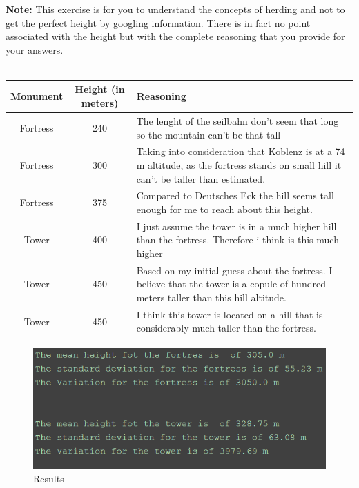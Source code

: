 \documentclass{WeSTassignment}
\begin{document}
\textbf{Note:} This exercise is for you to understand the concepts of herding and not to get the perfect height by googling information. There is in fact no point associated with the height but with the complete reasoning that you provide for your answers. \\ \\

\begin{center}
\begin{tabular}{ | c | c | p{7cm} | }
\hline
Monument & Height (in meters) & Reasoning \\
\hline
 Fortress & 240 & The lenght of the seilbahn don't seem that long so the mountain can't be that tall \\ 
 \hline
 Fortress & 300 & Taking into consideration that Koblenz is at a 74 m altitude, as the fortress stands on small hill it can't be taller than estimated. \\  
 \hline
 Fortress & 375 & Compared to Deutsches Eck the hill seems tall enough for me to reach about this height.  \\
\hline
 Tower & 400 &  I just assume the tower is in a much higher hill than the fortress. Therefore i think is this much higher  \\
 \hline
 Tower & 450 & Based on my initial guess about the fortress. I believe that the tower is a copule of hundred meters taller than this hill altitude.  \\
 \hline
 Tower & 450 & I think this tower is located on a hill that is considerably much taller than the fortress.  \\
 \hline
\end{tabular}
\end{center}


\begin{figure}[h]
  \centering
  \includegraphics{guesses.png}
   \caption{Results}
     \label{fig:dig} 
\end{figure}




\makefooter
\end{document}
